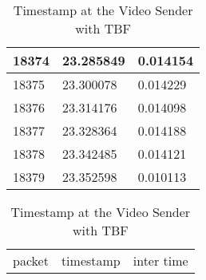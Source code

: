 \documentclass[a4paper,9pt]{beamer}
\begin{document}
{\begin{table}[htbp]
\begin{minipage}{0.5\linewidth}
\begin{tabular}{|l|l|l|}
\hline
18374&23.285849&0.014154\\
\hline
18375&23.300078&0.014229\\
\hline
18376&23.314176&0.014098\\
\hline
18377&23.328364&0.014188\\
\hline
18378&23.342485&0.014121\\
\hline
18379&23.352598&0.010113\\
\hline
  \end{tabular}
  \end{minipage}
  \begin{minipage}{0.4\linewidth}%
  \caption{Timestamp at the Video Sender with TBF}
  \begin{tabular}{|l|l|l|}
    \hline 
     packet      &  timestamp  &inter time\\
 

\end{tabular}
\end{minipage}
\end{table}}
\end{document}
